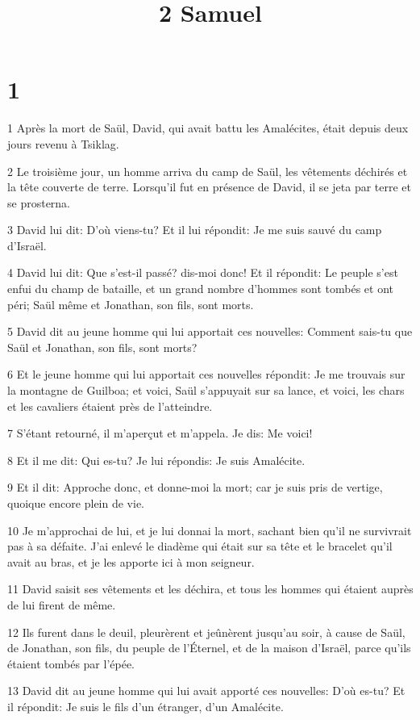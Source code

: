 

\title{2 Samuel}


\chapter{1}

\par 1 Après la mort de Saül, David, qui avait battu les Amalécites, était depuis deux jours revenu à Tsiklag.
\par 2 Le troisième jour, un homme arriva du camp de Saül, les vêtements déchirés et la tête couverte de terre. Lorsqu'il fut en présence de David, il se jeta par terre et se prosterna.
\par 3 David lui dit: D'où viens-tu? Et il lui répondit: Je me suis sauvé du camp d'Israël.
\par 4 David lui dit: Que s'est-il passé? dis-moi donc! Et il répondit: Le peuple s'est enfui du champ de bataille, et un grand nombre d'hommes sont tombés et ont péri; Saül même et Jonathan, son fils, sont morts.
\par 5 David dit au jeune homme qui lui apportait ces nouvelles: Comment sais-tu que Saül et Jonathan, son fils, sont morts?
\par 6 Et le jeune homme qui lui apportait ces nouvelles répondit: Je me trouvais sur la montagne de Guilboa; et voici, Saül s'appuyait sur sa lance, et voici, les chars et les cavaliers étaient près de l'atteindre.
\par 7 S'étant retourné, il m'aperçut et m'appela. Je dis: Me voici!
\par 8 Et il me dit: Qui es-tu? Je lui répondis: Je suis Amalécite.
\par 9 Et il dit: Approche donc, et donne-moi la mort; car je suis pris de vertige, quoique encore plein de vie.
\par 10 Je m'approchai de lui, et je lui donnai la mort, sachant bien qu'il ne survivrait pas à sa défaite. J'ai enlevé le diadème qui était sur sa tête et le bracelet qu'il avait au bras, et je les apporte ici à mon seigneur.
\par 11 David saisit ses vêtements et les déchira, et tous les hommes qui étaient auprès de lui firent de même.
\par 12 Ils furent dans le deuil, pleurèrent et jeûnèrent jusqu'au soir, à cause de Saül, de Jonathan, son fils, du peuple de l'Éternel, et de la maison d'Israël, parce qu'ils étaient tombés par l'épée.
\par 13 David dit au jeune homme qui lui avait apporté ces nouvelles: D'où es-tu? Et il répondit: Je suis le fils d'un étranger, d'un Amalécite.
